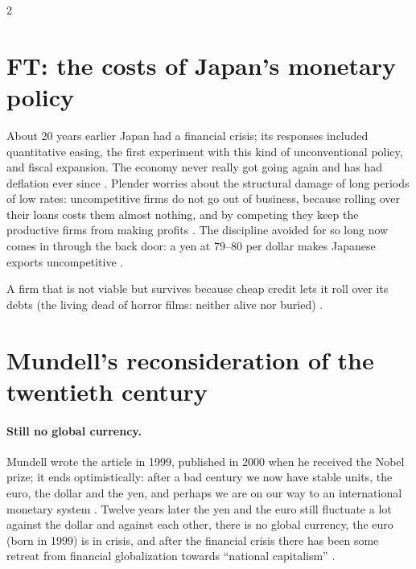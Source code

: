 \begin{paracol}{2}
\section{FT: the costs of Japan's monetary policy}\label{sec:intl-ft}

\begin{casestudy}
About 20 years earlier Japan had a financial crisis; its responses included quantitative easing, the first experiment with this kind of unconventional
policy, and fiscal expansion. The economy never really got going again and has had deflation ever since .
Plender worries about the structural damage of long periods of low rates: uncompetitive firms do not go out of business, because rolling over their loans
costs them almost nothing, and by competing they keep the productive firms from making profits . The
discipline avoided for so long now comes in through the back door: a yen at 79--80 per dollar makes Japanese exports uncompetitive
.
\end{casestudy}

\begin{definition}
A firm that is not viable but survives because cheap credit lets it roll over its debts (the living dead of horror films: neither alive nor buried)
.
\end{definition}

\section{Mundell's reconsideration of the twentieth century}\label{sec:intl-mundell}

\paragraph{Still no global currency.} Mundell wrote the article in 1999, published in 2000 when he received the Nobel prize; it ends optimistically: after a bad
century we now have stable units, the euro, the dollar and the yen, and perhaps we are on our way to an international monetary system
. Twelve years later the yen and the euro still fluctuate a lot against the dollar and against each other, there is no global
currency, the euro (born in 1999) is in crisis, and after the financial crisis there has been some retreat from financial globalization towards ``national
capitalism'' .


\end{paracol}
